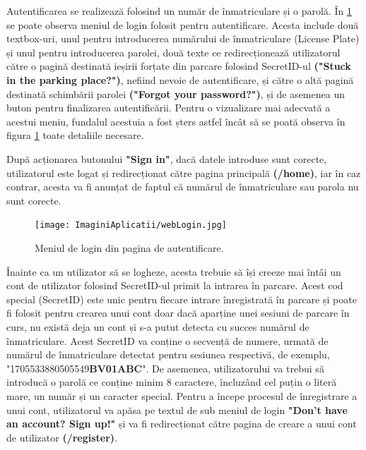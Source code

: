 \documentclass[12pt]{article}
\begin{document}
Autentificarea se realizeaz\u{a} folosind un num\u{a}r de \^{i}nmatriculare și o parol\u{a}. \^{I}n \ref{fig:aplicatie_login_page} se poate observa meniul de login folosit pentru autentificare. Acesta include dou\u{a} textbox-uri, unul pentru introducerea num\u{a}rului de \^{i}nmatriculare (License Plate) și unul pentru introducerea parolei, dou\u{a} texte ce redirecționeaz\u{a} utilizatorul c\u{a}tre o pagin\u{a} destinat\u{a} ieșirii forțate din parcare folosind SecretID-ul \textbf{("Stuck in the parking place?")}, nefiind nevoie de autentificare, și c\u{a}tre o alt\u{a} pagin\u{a} destinat\u{a} schimb\u{a}rii parolei \textbf{("Forgot your password?")}, și de asemenea un buton pentru finalizarea autentific\u{a}rii. Pentru o vizualizare mai adecvat\u{a} a acestui meniu, fundalul acestuia a fost șters astfel \^{i}nc\^{a}t s\u{a} se poat\u{a} observa \^{i}n figura \ref{fig:aplicatie_login_page} toate detaliile necesare.

Dup\u{a} acționarea butonului \textbf{"Sign in"}, dac\u{a} datele introduse sunt corecte, utilizatorul este logat și redirecționat c\u{a}tre pagina principal\u{a} \textbf{(/home)}, iar \^{i}n caz contrar, acesta va fi anunțat de faptul c\u{a} num\u{a}rul de \^{i}nmatriculare sau parola nu sunt corecte.

\begin{figure}[H]
  \centering
  \texttt{[image: ImaginiAplicatii/webLogin.jpg]}
  \caption{Meniul de login din pagina de autentificare.}
  \label{fig:aplicatie_login_page}
\end{figure}

\^{I}nainte ca un utilizator s\u{a} se logheze, acesta trebuie s\u{a} \^{i}și creeze mai \^{i}nt\^{a}i un cont de utilizator folosind SecretID-ul primit la intrarea \^{i}n parcare. Acest cod special (SecretID) este unic pentru fiecare intrare \^{i}nregistrat\u{a} \^{i}n parcare și poate fi folosit pentru crearea unui cont doar dac\u{a} aparține unei sesiuni de parcare \^{i}n curs, nu exist\u{a} deja un cont și s-a putut detecta cu succes num\u{a}rul de \^{i}nmatriculare. Acest SecretID va conține o secvenț\u{a} de numere, urmat\u{a} de num\u{a}rul de \^{i}nmatriculare detectat pentru sesiunea respectiv\u{a}, de exemplu, "1705533880505549\textbf{BV01ABC}". De asemenea, utilizatorului va trebui s\u{a} introduc\u{a} o parol\u{a} ce conține minim 8 caractere, \^{i}ncluz\^{a}nd cel puțin o liter\u{a} mare, un num\u{a}r și un caracter special. Pentru a \^{i}ncepe procesul de \^{i}nregistrare a unui cont, utilizatorul va ap\u{a}sa pe textul de sub meniul de login \textbf{"Don't have an account? Sign up!"} și va fi redirecționat c\u{a}tre pagina de creare a unui cont de utilizator \textbf{(/register)}.
\end{document}
